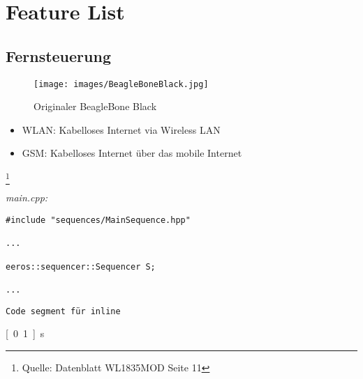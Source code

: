 


\chapter{Feature List}
\section{Fernsteuerung}


\begin{figure}[!ht]
\centering
\texttt{[image: images/BeagleBoneBlack.jpg]}
\caption{Originaler BeagleBone Black}
\label{fig:BeagleBoneBlack}
\end{figure}


\begin{itemize}
\item WLAN: Kabelloses Internet via Wireless LAN
\item GSM: Kabelloses Internet über das mobile Internet
\end{itemize}


\footnote{Quelle: Datenblatt WL1835MOD Seite 11}

\-\hspace{2cm}

\textit{main.cpp:}\
\begin{lstlisting}
#include "sequences/MainSequence.hpp"

...

eeros::sequencer::Sequencer S;

...
\end{lstlisting}


\texttt{Code segment für inline} 


\usepackage{units}
\unit[0.1]{s}

